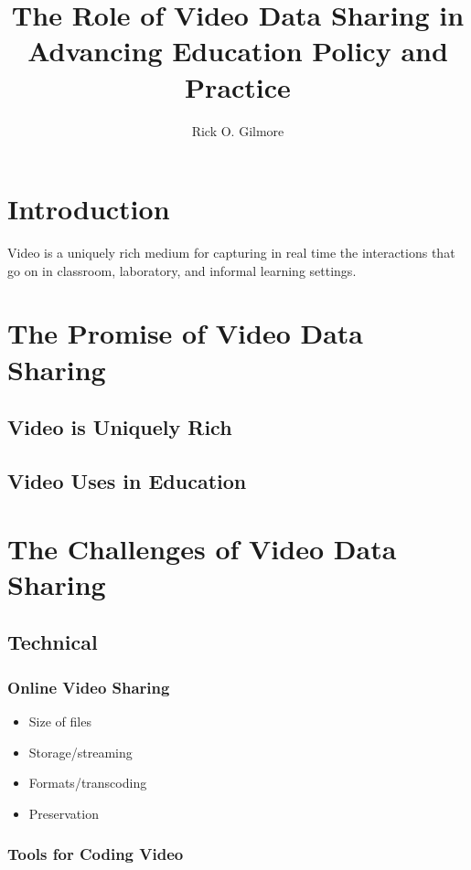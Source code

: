 \documentclass[letterpaper,man,natbib]{apa6}
\title{The Role of Video Data Sharing in Advancing Education Policy and Practice}
\author{Rick O. Gilmore}
\affiliation{The Databrary (databrary.org) Project \\ \& The Pennsylvania State University}
\begin{document}
\maketitle

\section{Introduction}

Video is a uniquely rich medium for capturing in real time the interactions that go on in classroom, laboratory, and informal learning settings. 

\section{The Promise of Video Data Sharing}

\subsection{Video is Uniquely Rich}

\subsection{Video Uses in Education}

\section{The Challenges of Video Data Sharing}

\subsection{Technical}

\subsubsection{Online Video Sharing}

\begin{itemize}
\item Size of files
\item Storage/streaming
\item Formats/transcoding
\item Preservation
\end{itemize}


\subsubsection{Tools for Coding Video}
\end{document}

